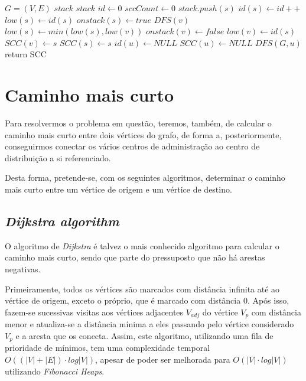 \documentclass[12pt,a4paper]{report}
\begin{document}
		\begin{center}
			\begin{algorithmic}[1]
				\State $G = (V, E)$
				\State $stack$ $stack$
				\State $id \leftarrow 0$
				\State $sccCount \leftarrow 0$
				\newline
					\State $stack.push(s)$
					\State $id(s) \leftarrow id++$
					\State $low(s) \leftarrow id(s)$
					\State $onstack(s) \leftarrow true$
							\State $DFS(v)$
						\EndIf
							\State $low(s) \leftarrow min(low(s), low(v))$
						\EndIf
					\EndFor
							\State $onstack(v) \leftarrow false$
							\State $low(v) \leftarrow id(s)$
							\State $SCC(v) \leftarrow s$
						\EndWhile
						\State $SCC(s) \leftarrow s$
					\EndIf
				\EndFunction
				\newline
					\State $id(u) \leftarrow NULL$
					\State $SCC(u) \leftarrow NULL$
				\EndFor
						\State $DFS(G,u)$
					\EndIf
				\EndFor
				\State return SCC
				\EndFunction
			\end{algorithmic}
		\end{center}


	\section{Caminho mais curto}
	Para resolvermos o problema em questão, teremos, também, de calcular o caminho mais curto entre dois vértices do grafo, de forma a, posteriormente, conseguirmos conectar os vários centros de administração ao centro de distribuição a si referenciado. \par
	Desta forma, pretende-se, com os seguintes algoritmos, determinar o caminho mais curto entre um vértice de origem e um vértice de destino.

		\subsection{\textit{Dijkstra algorithm}}
		O algoritmo de \textit{Dijkstra} é talvez o mais conhecido algoritmo para calcular o caminho mais curto, sendo que parte do pressuposto que não há arestas negativas. \par
		Primeiramente, todos os vértices são marcados com distância infinita até ao vértice de origem, exceto o próprio, que é marcado com distância 0. Após isso, fazem-se sucessivas visitas aos vértices adjacentes \( V_{adj} \)  do vértice \(V_p\) com distância menor e atualiza-se a distância mínima a eles passando pelo vértice considerado \(V_p\) e a aresta que os conecta. Assim, este algoritmo, utilizando uma fila de prioridade de mínimos, tem uma complexidade temporal \(O((|V|+|E|)\cdot log|V|)\), apesar de poder ser melhorada para \(O(|V|\cdot log|V|)\) utilizando \textit{Fibonacci Heaps}.
\end{document}
